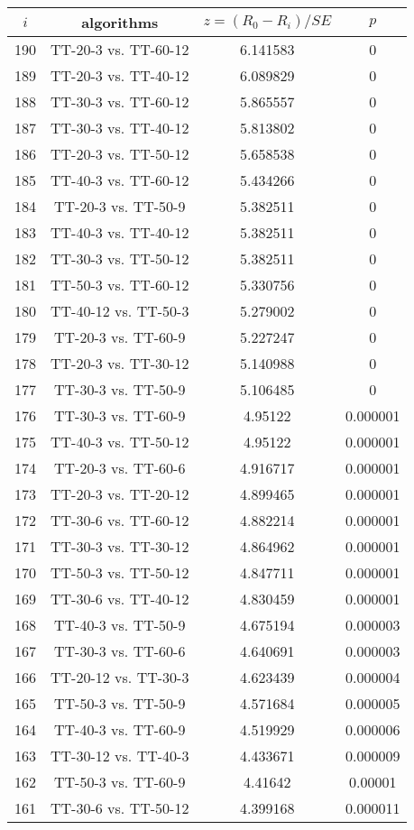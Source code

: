 \documentclass[a4paper,10pt]{article}
\begin{document}
\begin{landscape}
\begin{table}[!htp]
\centering\scriptsize
\begin{tabular}{cccc}
$i$&algorithms&$z=(R_0 - R_i)/SE$&$p$\\
\hline190&TT-20-3 vs. TT-60-12&6.141583&0\\
189&TT-20-3 vs. TT-40-12&6.089829&0\\
188&TT-30-3 vs. TT-60-12&5.865557&0\\
187&TT-30-3 vs. TT-40-12&5.813802&0\\
186&TT-20-3 vs. TT-50-12&5.658538&0\\
185&TT-40-3 vs. TT-60-12&5.434266&0\\
184&TT-20-3 vs. TT-50-9&5.382511&0\\
183&TT-40-3 vs. TT-40-12&5.382511&0\\
182&TT-30-3 vs. TT-50-12&5.382511&0\\
181&TT-50-3 vs. TT-60-12&5.330756&0\\
180&TT-40-12 vs. TT-50-3&5.279002&0\\
179&TT-20-3 vs. TT-60-9&5.227247&0\\
178&TT-20-3 vs. TT-30-12&5.140988&0\\
177&TT-30-3 vs. TT-50-9&5.106485&0\\
176&TT-30-3 vs. TT-60-9&4.95122&0.000001\\
175&TT-40-3 vs. TT-50-12&4.95122&0.000001\\
174&TT-20-3 vs. TT-60-6&4.916717&0.000001\\
173&TT-20-3 vs. TT-20-12&4.899465&0.000001\\
172&TT-30-6 vs. TT-60-12&4.882214&0.000001\\
171&TT-30-3 vs. TT-30-12&4.864962&0.000001\\
170&TT-50-3 vs. TT-50-12&4.847711&0.000001\\
169&TT-30-6 vs. TT-40-12&4.830459&0.000001\\
168&TT-40-3 vs. TT-50-9&4.675194&0.000003\\
167&TT-30-3 vs. TT-60-6&4.640691&0.000003\\
166&TT-20-12 vs. TT-30-3&4.623439&0.000004\\
165&TT-50-3 vs. TT-50-9&4.571684&0.000005\\
164&TT-40-3 vs. TT-60-9&4.519929&0.000006\\
163&TT-30-12 vs. TT-40-3&4.433671&0.000009\\
162&TT-50-3 vs. TT-60-9&4.41642&0.00001\\
161&TT-30-6 vs. TT-50-12&4.399168&0.000011\\

\end{tabular}
\end{table}
\end{landscape}
\end{document}
